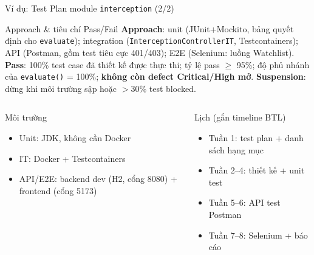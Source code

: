 \documentclass[aspectratio=169,12pt]{beamer}
\begin{document}
\begin{frame}[shrink=12]{Ví dụ: Test Plan module \texttt{interception} (2/2)}
  \small
  \begin{block}{Approach \& tiêu chí Pass/Fail}
    \textbf{Approach}: unit (JUnit+Mockito, bảng quyết định cho \texttt{evaluate});
    integration (\texttt{InterceptionControllerIT}, Testcontainers); API (Postman,
    gồm test tiêu cực 401/403); E2E (Selenium: luồng Watchlist).\\
    \textbf{Pass}: 100\% test case đã thiết kế được thực thi; tỷ lệ pass $\ge$ 95\%;
    độ phủ nhánh của \texttt{evaluate()} = 100\%; \textbf{không còn defect
    Critical/High mở}. \textbf{Suspension}: dừng khi môi trường sập hoặc $>$30\% test blocked.
  \end{block}

  \begin{columns}[T]
    \begin{block}{Môi trường}
      \begin{itemize}
        \item Unit: JDK, không cần Docker
        \item IT: Docker + Testcontainers
        \item API/E2E: backend dev (H2, cổng 8080) + frontend (cổng 5173)
      \end{itemize}
    \end{block}
    \begin{block}{Lịch (gắn timeline BTL)}
      \begin{itemize}
        \item Tuần 1: test plan + danh sách hạng mục
        \item Tuần 2--4: thiết kế + unit test
        \item Tuần 5--6: API test Postman
        \item Tuần 7--8: Selenium + báo cáo
      \end{itemize}
    \end{block}
  \end{columns}
\end{frame}
\end{document}
